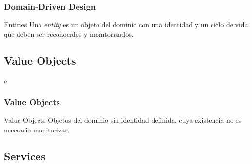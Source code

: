 \documentclass[a4paper,slidestop,xcolor=pst,dvips,blue]{beamer}
\begin{document}
%
%
\begin{frame}[c]
    \frametitle{Domain-Driven Design}
     \begin{block}{Entities}
        Una \emph{entity} es un objeto del dominio con una identidad y un ciclo de vida que deben ser reconocidos y monitorizados.
     \end{block}
\end{frame}
%
%
%
\subsection{Value Objects}

\begin{frame}{c}
    \frametitle{Value Objects}
    \begin{block}{Value Objects}
    Objetos del dominio sin identidad definida, cuya existencia no es necesario monitorizar.
    \end{block}
\end{frame}

\subsection{Services}
\end{document}
